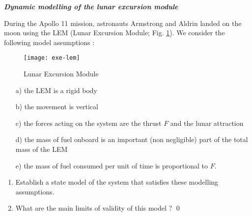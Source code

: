 \begin{exercice}{\bf \em Dynamic modelling of the lunar excursion module}

During the Apollo 11 mission, astronauts Armstrong and Aldrin landed on the moon using the LEM (Lunar Excursion Module; Fig. \ref{Fig:exe-lem}). We consider the following model assumptions : 
\begin{figure}[ht]
\begin{center}
\texttt{[image: exe-lem]}
\caption{Lunar Excursion Module}
\label{Fig:exe-lem}
\end{center}
\end{figure}
\begin{itemize}
\item[a)] the LEM is a rigid body
\item[b)] the movement is vertical
\item[c)] the forces acting on the system are the thrust $F$ and the lunar attraction
\item[d)] the mass of fuel onboard is an
important (non negligible) part of the total mass of the LEM
\item[e)] the mass of fuel consumed per unit of time is proportional to $F$.
\end{itemize}
\begin{enumerate}
\item Establish a state model of the system that satisfies these
modelling assumptions.
\item What are the main limits of validity of this
model ? \qed
\end{enumerate}
\end{exercice}
\vv

